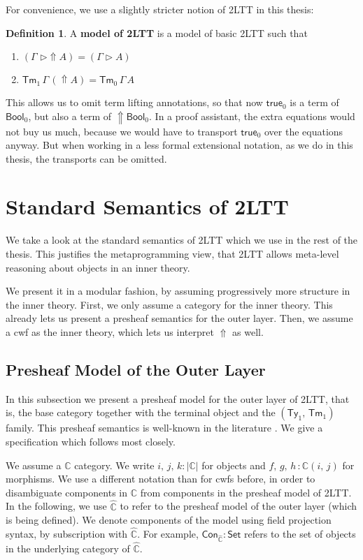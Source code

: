 \documentclass[12pt,a4paper,twoside,openany]{book}
\theoremstyle{remark}
\theoremstyle{definition}
\newtheorem{mydefinition}{Definition}
\newcommand{\ms}[1]{\mathsf{#1}}
\newcommand{\mbb}[1]{\mathbb{#1}}
\newcommand{\Con}{\mathsf{Con}}
\newcommand{\Tm}{\mathsf{Tm}}
\newcommand{\Ty}{\mathsf{Ty}}
\newcommand{\Set}{\mathsf{Set}}
\newcommand{\Lift}{\Uparrow}
\newcommand{\ext}{\triangleright}
\newcommand{\Bool}{\ms{Bool}}
\newcommand{\mbbC}{\mbb{C}}
\newcommand{\hmbbC}{\hat{\mbb{C}}}
\newcommand{\true}{\ms{true}}
\begin{document}
For convenience, we use a slightly stricter notion of 2LTT in
this thesis:
\begin{mydefinition}\label{def:2ltt} A \textbf{model of 2LTT} is a model of basic 2LTT such that
\begin{enumerate}
  \item $(\Gamma\,\,\ext \Lift\!A) = (\Gamma \ext A)$
  \item $\Tm_1\,\Gamma\,(\Lift\!A) = \Tm_0\,\Gamma\,A$
\end{enumerate}
\end{mydefinition}
This allows us to omit term lifting annotations, so that now $\true_0$ is a term
of $\Bool_0$, but also a term of $\Lift \Bool_0$. In a proof assistant, the extra
equations would not buy us much, because we would have to transport $\true_0$
over the equations anyway. But when working in a less formal extensional
notation, as we do in this thesis, the transports can be omitted.

\section{Standard Semantics of 2LTT}

We take a look at the standard semantics of 2LTT which we use in the rest of the
thesis. This justifies the metaprogramming view, that 2LTT allows meta-level
reasoning about objects in an inner theory.

We present it in a modular fashion, by assuming progressively more structure in
the inner theory. First, we only assume a category for the inner theory. This
already lets us present a presheaf semantics for the outer layer. Then, we
assume a cwf as the inner theory, which lets us interpret $\Lift$ as well.

\subsection{Presheaf Model of the Outer Layer}

In this subsection we present a presheaf model for the outer layer of 2LTT, that
is, the base category together with the terminal object and the $(\Ty_1,\,\Tm_1)$
family. This presheaf semantics is well-known in the literature \cite{TODO}. We
give a specification which follows \cite{TODO} most closely.

We assume a $\mbbC$ category. We write $i,\,j,\,k : |\mbbC|$ for objects and
$f,\,g,\,h\,: \mbbC(i,\,j)$ for morphisms. We use a different notation than for
cwfs before, in order to disambiguate components in $\mbbC$ from components in
the presheaf model of 2LTT. In the following, we use $\hmbbC$ to refer to the
presheaf model of the outer layer (which is being defined). We denote components
of the model using field projection syntax, by subscription with $\hmbbC$. For
example, $\Con_{\hmbbC} : \Set$ refers to the set of objects in the underlying
category of $\hmbbC$.
\end{document}
